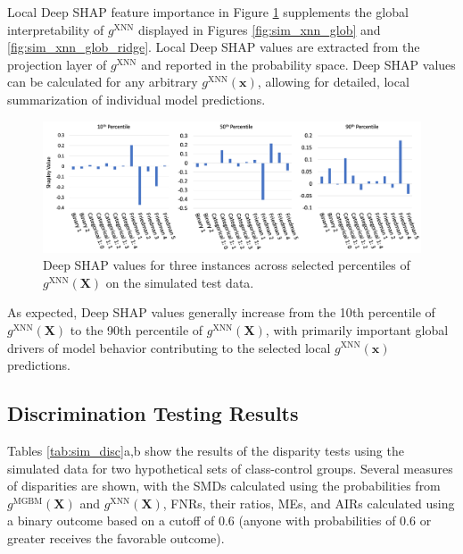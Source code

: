 \documentclass[information,article,accept,moreauthors,pdftex]{Definitions/mdpi}
\begin{document}
Local Deep SHAP feature importance in Figure \ref{fig:sim_xnn_loc} supplements the global interpretability of $g^\text{XNN}$ displayed in Figures \ref{fig:sim_xnn_glob} and \ref{fig:sim_xnn_glob_ridge}. Local Deep SHAP values are extracted from the projection layer of $g^\text{XNN}$ and reported in the probability space. Deep SHAP values can be calculated for any arbitrary $g^\text{XNN}(\mathbf{x})$, allowing for detailed, local summarization of individual model predictions. 

\begin{figure}[H]
	\centering
	\includegraphics[width=15cm]{img/sim_xnn_loc.png}
	\caption{Deep SHAP values for three instances across selected percentiles of $g^\text{XNN}(\mathbf{X})$ on the simulated test data.}
	\label{fig:sim_xnn_loc}
\end{figure}  

 As expected, Deep SHAP values generally increase from the 10{th} percentile of $g^\text{XNN}(\mathbf{X})$ to the 90{th} percentile of $g^\text{XNN}(\mathbf{X})$, with primarily important global drivers of model behavior contributing to the selected local $g^\text{XNN}(\mathbf{x})$ predictions.

\subsection{Discrimination Testing Results}\label{a_ssec:dis_sim}

Tables \ref{tab:sim_disc}{a,b} show the results of the disparity tests using the simulated data for two hypothetical sets of class-control groups.  Several measures of disparities are shown, with the SMDs calculated using the probabilities from $g^{\text{MGBM}}(\mathbf{X})$ and  $g^{\text{XNN}}(\mathbf{X})$, FNRs, their ratios, MEs, and AIRs calculated using a binary outcome based on a cutoff of 0.6 (anyone with probabilities of 0.6 or greater receives the favorable outcome).
\end{document}
